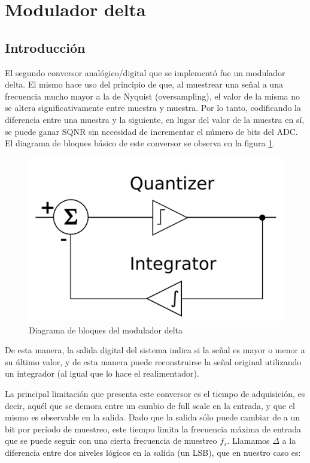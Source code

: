 \documentclass[assd_tp3_main.tex]{subfiles}
\begin{document}
\section{Modulador delta}

\subsection{Introducci\'on}

El segundo conversor anal\'ogico/digital que se implement\'o fue un modulador delta. El mismo hace uso del principio de que, al muestrear una se\~nal a una frecuencia mucho mayor a la de Nyquist (oversampling), el valor de la misma no se altera significativamente entre muestra y muestra. Por lo tanto, codificando la diferencia entre una muestra y la siguiente, en lugar del valor de la muestra en s\'i, se puede ganar SQNR sin necesidad de incrementar el n\'umero de bits del ADC. El diagrama de bloques b\'asico de este conversor se observa en la figura \ref{fig:delta-bloques}.

\begin{figure}[htb]
	\centering
	\includegraphics[width=0.6 \textwidth]
	{images/ej3/delta-bloques.png}
	\caption{Diagrama de bloques del modulador delta}
	\label{fig:delta-bloques}
\end{figure}

De esta manera, la salida digital del sistema indica si la se\~nal es mayor o menor a su \'ultimo valor, y de esta manera puede reconstruirse la se\~nal original utilizando un integrador (al igual que lo hace el realimentador).

La principal limitaci\'on que presenta este conversor es el tiempo de adquisici\'on, es decir, aqu\'el que se demora entre un cambio de full scale en la entrada, y que el mismo es observable en la salida. Dado que la salida s\'olo puede cambiar de a un bit por per\'iodo de muestreo, este tiempo limita la frecuencia m\'axima de entrada que se puede seguir con una cierta frecuencia de muestreo $f_s$. Llamamos $\Delta$ a la diferencia entre dos niveles l\'ogicos en la salida (un LSB), que en nuestro caso es:
\end{document}

